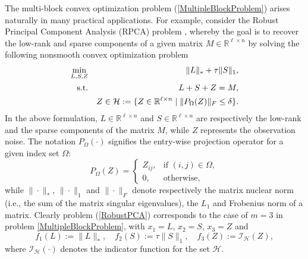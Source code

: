 \documentclass{mcom-l}
\theoremstyle{definition}
\theoremstyle{remark}
\numberwithin{equation}{section}
\begin{document}
The multi-block convex optimization  problem (\ref{MultipleBlockProblem}) arises naturally in many practical applications. For example, consider the Robust Principal Component Analysis (RPCA) problem \cite{CandesRPCA2011}, whereby the goal is to recover the low-rank and sparse components of a given matrix $M\in \mathbb{R}^{\ell\times n}$ by solving the following nonsmooth convex optimization problem
\begin{eqnarray}\label{RobustPCA}
\min_{L,S,Z} && \|L\|_* + \tau \|S\|_1,\\
\hbox{s.t.} && L + S + Z = M,\nonumber\\
&&Z\in {\mathcal{H}}:=\{Z\in \mathbb{R}^{\ell\times
n}\mid \|P_{\Omega}(Z)\|_F\le \delta\}.\nonumber
\end{eqnarray}
In the above formulation, $L \in \mathbb{R}^{\ell\times n}$ and $S \in \mathbb{R}^{\ell\times n}$ are respectively the low-rank and the sparse components of the matrix $M$, while $Z$ represents the observation noise. The notation $P_{\Omega}(\cdot)$ signifies the entry-wise projection operator for a given index set $\Omega$:
\[
P_{\Omega}(Z)=\left\{\begin{array}{ll}
Z_{ij},& \mbox{if } (i,j)\in \Omega,\\
0,&\mbox{otherwise,}
\end{array}\right.
\]
while $\|\cdot\|_*$, $\|\cdot\|_1$ and $\|\cdot\|_F$ denote respectively the matrix nuclear norm (i.e., the sum of the matrix singular eigenvalues), the $L_1$ and Frobenius norm of a matrix. Clearly problem (\ref{RobustPCA}) corresponds to the case of $m=3$ in problem \eqref{MultipleBlockProblem}, with $x_1 = L$, $x_2 = S$, $x_3 = Z$ and
$$
f_1(L) := \|L\|_*,\quad f_2(S) := \tau\|S\|_1,\quad f_3(Z) :=
{\mathcal{I}}_{\mathcal{H}}(Z),
$$
where $\mathcal{I}_{\mathcal{H}}(\cdot)$ denotes the indicator function for the set ${\mathcal{H}}$.
\end{document}
